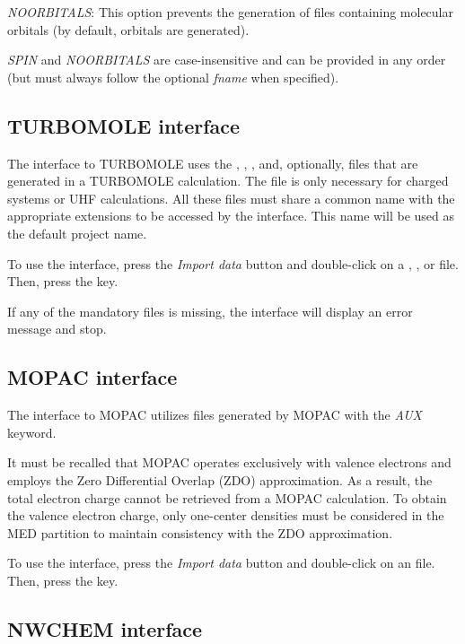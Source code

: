 \documentclass[10pt]{article}
\begin{document}
{\it NOORBITALS}: This option prevents the generation of files containing molecular orbitals (by 
default, orbitals are generated).

{\it SPIN} and {\it NOORBITALS} are case-insensitive and can be provided in any order 
(but must always follow the optional {\it fname} when specified).


\subsection{TURBOMOLE interface \label{sec:5.4}}

The interface to TURBOMOLE uses the \basis{ }, \mos{ }, \coords{ }, and,
optionally, \control{ } files that are generated in a TURBOMOLE calculation.
The \control{ } file is only necessary for charged systems or UHF
calculations. All these files must share a common name with the appropriate 
extensions to be accessed by the interface. This name will be used as the default project name.

To use the interface, press the {\it Import data} button \teclapuntos and double-click
on a \basis{ }, \mos{ }, or \coords{ } file. Then, press the \exec key.

If any of the mandatory files is missing, the interface will display an error message and stop.

\subsection{MOPAC interface \label{sec:5.5}}

The interface to MOPAC utilizes \aux{ } files generated by MOPAC with the {\it AUX} keyword.

It must be recalled that MOPAC operates exclusively with valence electrons and employs the 
Zero Differential Overlap (ZDO) approximation.
As a result, the total electron charge cannot be retrieved from a MOPAC calculation.
To obtain the valence electron charge, only one-center densities must be considered 
in the MED partition to maintain consistency with the ZDO approximation.

To use the interface, press the {\it Import data} button \teclapuntos and double-click
on an \aux{ } file. Then, press the \exec key.


\subsection{NWCHEM interface \label{sec:5.6}}
\end{document}
